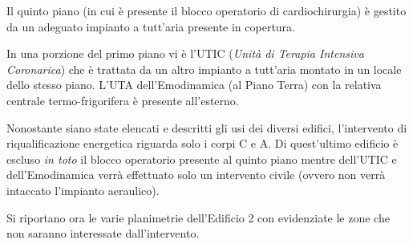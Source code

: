 Il quinto piano (in cui è presente il blocco operatorio di cardiochirurgia) è gestito da un adeguato impianto a tutt'aria presente in copertura.

In una porzione del primo piano vi è l'UTIC (\emph{Unità di Terapia Intensiva Coronarica}) che è trattata da un altro impianto a tutt'aria montato in un locale dello stesso piano. L'UTA dell'Emodinamica (al Piano Terra) con la relativa centrale termo-frigorifera è presente all'esterno.

Nonostante siano state elencati e descritti gli usi dei diversi edifici, l'intervento di riqualificazione energetica riguarda solo i corpi C e A. Di quest'ultimo edificio è escluso \emph{in toto} il blocco operatorio presente al quinto piano mentre dell'UTIC e dell'Emodinamica verrà effettuato solo un intervento civile (ovvero non verrà intaccato l'impianto aeraulico).

Si riportano ora le varie planimetrie dell'Edificio 2 con evidenziate le zone che non saranno interessate dall'intervento.

\label{PT}
\label{P1}
\label{P2}
\label{P3}
\label{P4}


